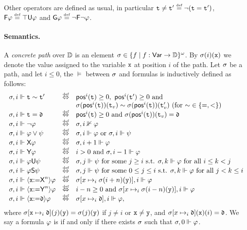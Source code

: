  Other operators are defined as usual, in particular $\aterm\neq \aterm'\egdef \neg(\aterm = \aterm')$, $\Eventually\aformula \egdef \top\Until\aformula$ and $\Always\aformula \egdef \neg\Eventually\neg\aformula$. 


\paragraph{Semantics.} A \emph{concrete path} over $\mathbb{D}$ is an element $\sigma\in\{f\mid f:{\rm \sf Var}\to\mathbb{D}\}^\omega$. By $\sigma(i)(\mathtt{x})$ we denote the value assigned to the variable $\mathtt{x}$ at position $i$ of the path.
Let $\sigma$ be a path, and let $i\leq 0$, the  $\models$ between $\sigma$ and formulas is inductively defined as follows:
\[
\begin{array}{lcl}
\apath,i \models \aterm \sim \aterm' & \iffdef & \pos^i(\aterm) \geq 0, \ \pos^i(\aterm') \geq 0 \mbox{ and } \\ & & \apath(\pos^i(\aterm))(\aterm_v) \sim \apath(\pos^i(\aterm))(\aterm'_v)  \mbox{ (for ${\sim}\in\{=,<\}$) } \\
\apath,i \models \aterm = \adatum & \iffdef & \pos^i(\aterm) \geq 0 \mbox{ and } \apath(\pos^i(\aterm))(\aterm_v) = \adatum \\
\apath,i \models \neg\aformula & \iffdef & \apath,i \nVdash\aformula \\
\apath,i \models \aformula\vee\aformulabis & \iffdef & \apath,i \models \aformula \mbox{ or } \apath,i \models \aformulabis \\
\apath,i \models \Next\aformula & \iffdef & \apath,i+1 \models \aformula \\ 
\apath,i \models \Prev\aformula & \iffdef & i>0 \mbox{ and } \apath,i-1 \models \aformula \\
\apath,i \models \aformula\Until\aformulabis & \iffdef & \apath,j \models \aformulabis \mbox{ for some } j\geq i \mbox{ s.t. } \apath,k \models \aformula \mbox{ for all } i\leq k < j \\
\apath,i \models \aformula\Since\aformulabis & \iffdef & \apath,j \models \aformulabis \mbox{ for some } 0\leq j \leq i \mbox{ s.t. } \apath,k \models \aformula \mbox{ for all } j< k \leq i \\
\apath,i \models \Assign{\avar}{\Nextn}\aformula & \iffdef & \apath[x\mapsto_i \apath(i+n)(\avarbis)],i \models \aformula \\ 
\apath,i \models \Assign{\avar}{\Prevn}\aformula & \iffdef & i-n\geq 0 \mbox{ and } \apath[x\mapsto_i \apath(i-n)(\avarbis)],i \models \aformula \\
\apath,i \models \Assign{\avar}{\adatum}\aformula & \iffdef & \apath[x\mapsto_i \adatum],i \models \aformula, \\ 
\end{array}
\]
where $\sigma[\mathtt{x}\mapsto_i \mathfrak{d}](j)(\mathtt{y})=\sigma(j)(\mathtt{y})$ if $j\neq i$  or $\mathtt{x}\neq\mathtt{y}$, and $\sigma[x\mapsto_i \mathfrak{d}](\mathtt{x})(i)  = \mathfrak{d}$. 
We say a formula $\varphi$ is  if and only if there exists $\sigma$ such that $\sigma,0\Vdash\varphi$.




